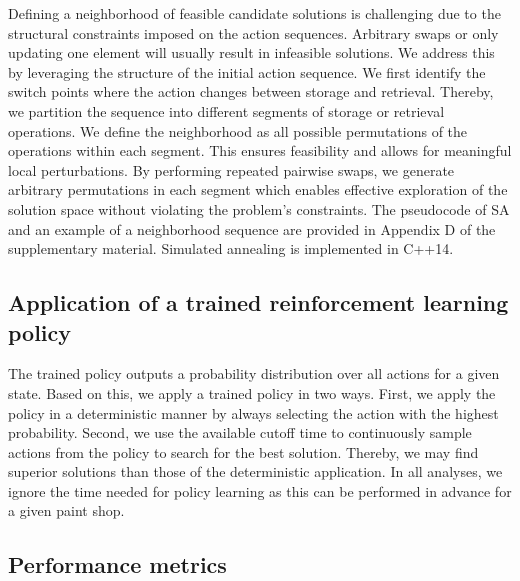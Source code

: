 \documentclass[11pt]{elsarticle}
\begin{document}
Defining a neighborhood of feasible candidate solutions is challenging due to the structural constraints imposed on the action sequences. Arbitrary swaps or only updating one element will usually result in infeasible solutions.
We address this by leveraging the structure of the initial action sequence. We first identify the switch points where the action changes between storage and retrieval. Thereby, we partition the sequence into different segments of storage or retrieval operations. We define the neighborhood as all possible permutations of the operations within each segment. This ensures feasibility and allows for meaningful local perturbations. By performing repeated pairwise swaps, we generate arbitrary permutations in each segment which enables effective exploration of the solution space without violating the problem's constraints. The pseudocode of SA and an example of a neighborhood sequence are provided in Appendix D of the supplementary material. Simulated annealing is implemented in C++14.



\subsection{Application of a trained reinforcement learning policy}

The trained policy outputs a probability distribution over all actions for a given state. Based on this, we apply a trained policy in two ways. First, we apply the policy in a deterministic manner by always selecting the action with the highest probability. Second, we use the available cutoff time to continuously sample actions from the policy to search for the best solution. Thereby, we may find superior solutions than those of the deterministic application. In all analyses, we ignore the time needed for policy learning as this can be performed in advance for a given paint shop.

\subsection{Performance metrics}
\label{section:Performance}
\end{document}
